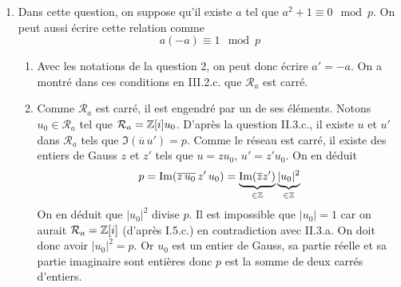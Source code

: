 \begin{enumerate}
\item Dans cette question, on suppose qu'il existe $a$ tel que $a^2+1 \equiv 0\mod p$. On peut aussi écrire cette relation comme
\begin{displaymath}
  a(-a)\equiv 1 \mod p
\end{displaymath}
\begin{enumerate}
  \item Avec les notations de la question $2$, on peut donc écrire $a' = -a$. On a montré dans ces conditions en III.2.c. que $\mathcal{R}_{a}$ est carré.

\item Comme $\mathcal{R}_{a}$ est carré, il est engendré par un de ses éléments. Notons $u_0\in \mathcal{R}_{a}$ tel que $\mathcal{R}_{a} = \mathbb{Z}[i]u_0$.\newline
D'après la question II.3.c., il existe $u$ et $u'$ dans $\mathcal{R}_{a}$ tels que $\Im(\overline{u}\,u')=p$. Comme le réseau est carré, il existe des entiers de Gauss $z$ et $z'$ tels que $u=zu_0$, $u'=z'u_0$. On en déduit
\begin{displaymath}
  p = \operatorname{Im}(\overline{z\,u_0}\,z'\,u_0) = 
\underset{\in \mathbb{Z}}{\underbrace{\operatorname{Im}(\overline{z}z')}}\,
\underset{\in \mathbb{Z}}{\underbrace{|u_0|^2}}
\end{displaymath}
On en déduit que $|u_0|^2$ divise $p$.\newline
Il est impossible que $|u_0|=1$ car on aurait $\mathcal{R}_a = \mathbb{Z}[i]$ (d'après I.5.c.) en contradiction avec II.3.a. On doit donc avoir $|u_0|^2=p$. Or $u_0$ est un entier de Gauss, sa partie réelle et sa partie imaginaire sont entières donc $p$ est la somme de deux carrés d'entiers.
\end{enumerate}
\end{enumerate}

